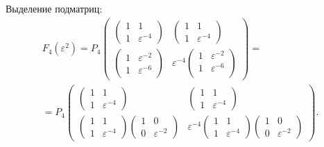 Выделение подматриц:
\begin{multline*}
    F_4(\varepsilon^2)
    =
    P_4
    \begin{pmatrix}
        \begin{pmatrix}
            1 & 1                \\
            1 & \varepsilon^{-4}
        \end{pmatrix}
        &
        \begin{pmatrix}
            1 & 1                \\
            1 & \varepsilon^{-4}
        \end{pmatrix}
        \\
        \begin{pmatrix}
            1 & \varepsilon^{-2} \\
            1 & \varepsilon^{-6}
        \end{pmatrix}
        &
        \varepsilon^{-4}
        \begin{pmatrix}
            1 & \varepsilon^{-2} \\
            1 & \varepsilon^{-6} \\
        \end{pmatrix}
    \end{pmatrix} = \\
%
    = P_4
    \begin{pmatrix}
        \begin{pmatrix}
            1 & 1                \\
            1 & \varepsilon^{-4}
        \end{pmatrix}
        &
        \begin{pmatrix}
            1 & 1                \\
            1 & \varepsilon^{-4}
        \end{pmatrix}
        \\
        \begin{pmatrix}
            1 & 1                \\
            1 & \varepsilon^{-4}
        \end{pmatrix}
        \begin{pmatrix}
            1 & 0                \\
            0 & \varepsilon^{-2}
        \end{pmatrix}
        &
        \varepsilon^{-4}
        \begin{pmatrix}
            1 & 1                \\
            1 & \varepsilon^{-4}
        \end{pmatrix}
        \begin{pmatrix}
            1 & 0                \\
            0 & \varepsilon^{-2}
        \end{pmatrix}
    \end{pmatrix} .
\end{multline*}


